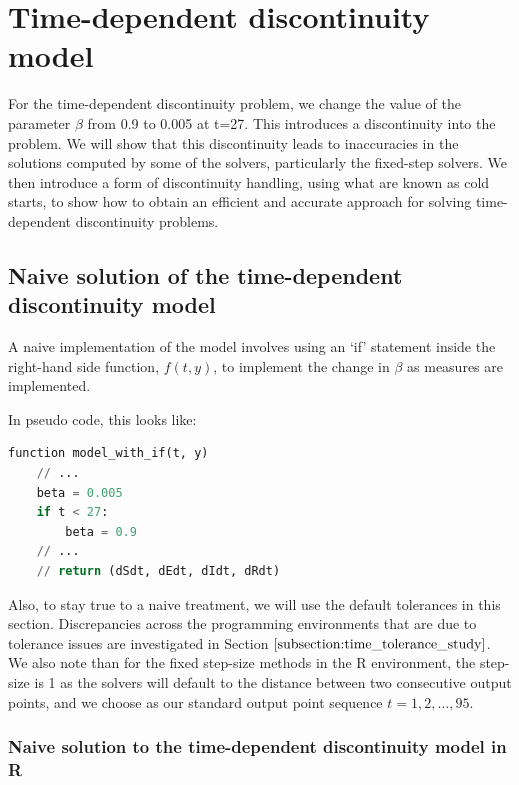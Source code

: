 \section{Time-dependent discontinuity model}
\label{section:time_problem}
For the time-dependent discontinuity problem, we change the value of the parameter $\beta$ from 0.9 to 0.005 at t=27. This introduces a discontinuity into the problem. We will show that this discontinuity leads to inaccuracies in the solutions computed by some of the solvers, particularly the fixed-step solvers. We then introduce a form of discontinuity handling, using what are known as cold starts, to show how to obtain an efficient and accurate approach for solving time-dependent discontinuity problems.

\subsection{Naive solution of the time-dependent discontinuity model}
\label{subsection:naive_time_problem}
A naive implementation of the model involves using an `if' statement inside the right-hand side function, $f(t, y)$, to implement the change in $\beta$ as measures are implemented. 

In pseudo code, this looks like:

\begin{minipage}{\linewidth}
\begin{lstlisting}[language=Python]
function model_with_if(t, y)
    // ...
    beta = 0.005
    if t < 27:
        beta = 0.9
    // ...
    // return (dSdt, dEdt, dIdt, dRdt)
\end{lstlisting}
\end{minipage}

Also, to stay true to a naive treatment, we will use the default tolerances in this section. Discrepancies across the programming environments that are due to tolerance issues are investigated in Section $\ref{subsection:time_tolerance_study}$. We also note than for the fixed step-size methods in the R environment, the step-size is 1 as the solvers will default to the distance between two consecutive output points, and we choose as our standard output point sequence $t=1, 2, \dots, 95$.

\subsubsection{Naive solution to the time-dependent discontinuity model in R}

